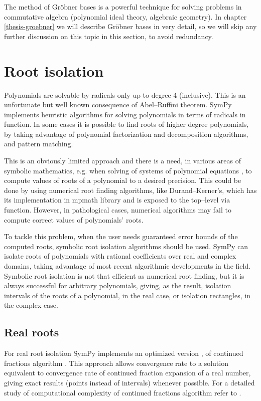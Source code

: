 The method of Gröbner bases is a powerful technique for solving problems in commutative
algebra (polynomial ideal theory, algebraic geometry). In chapter \ref{thesis-groebner}
we will describe Gröbner bases in very detail, so we will skip any further discussion
on this topic in this section, to avoid redundancy.


\section{Root isolation}

Polynomials are solvable by radicals only up to degree 4 (inclusive). This is an unfortunate
but well known consequence of Abel--Ruffini theorem. SymPy implements heuristic algorithms
for solving polynomials in terms of radicals in  function. In some cases it is
possible to find roots of higher degree polynomials, by taking advantage of polynomial
factorization and decomposition algorithms, and pattern matching.

This is an obviously limited approach and there is a need, in various areas of symbolic
mathematics, e.g. when solving of systems of polynomial equations \cite{Strzebonski1997computing},
to compute values of roots of a polynomial to a desired precision. This could be done by using
numerical root finding algorithms, like Durand--Kerner's, which has its implementation in mpmath
library and is exposed to the top--level via  function. However, in pathological
cases, numerical algorithms may fail to compute correct values of polynomials' roots.

To tackle this problem, when the user needs guaranteed error bounds of the computed roots,
symbolic root isolation algorithms should be used. SymPy can isolate roots of polynomials with
rational coefficients over real and complex domains, taking advantage of most recent algorithmic
developments in the field. Symbolic root isolation is not that efficient as numerical root finding,
but it is always successful for arbitrary polynomials, giving, as the result, isolation intervals
of the roots of a polynomial, in the real case, or isolation rectangles, in the complex case.


\subsection{Real roots}

For real root isolation SymPy implements an optimized version \cite{Akritas2008study},
\cite{Akritas2008improving} of continued fractions algorithm \cite{Collins1976descarte}. This
approach allows convergence rate to a solution equivalent to convergence rate of continued
fraction expansion of a real number, giving exact results (points instead of intervals)
whenever possible. For a detailed study of computational complexity of continued fractions
algorithm refer to \cite{Sharma2007complexity}.


